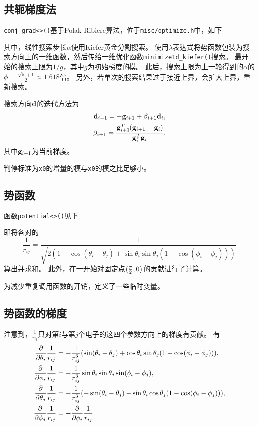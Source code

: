 \subsection{共轭梯度法}
\texttt{conj\_grad<>()}基于Polak-Ribiere算法，位于\texttt{misc/optimize.h}中，如下
{
    \linespread{1.0}
    
}
其中，线性搜索步长$\alpha$使用Kiefer黄金分割搜索。
使用$\lambda$表达式将势函数包装为搜索方向上的一维函数，然后传给一维优化函数\texttt{minimize1d\_kiefer()}搜索。
最开始的搜索上限为$1/g$，其中$g$为初始梯度的模。
此后，搜索上限为上一轮得到的$\alpha$的$\phi = \frac{\sqrt{5}+1}{2} \approx 1.618$倍。
另外，若单次的搜索结果过于接近上界，会扩大上界，重新搜索。

搜索方向$\vb{d}$的迭代方法为
\begin{gather}
    \vb{d}_{i+1} = -\vb{g}_{i+1} + \beta_{i+1}\vb{d}_{i},\\
    \beta_{i+1} = \frac{\vb{g}^T_{i+1}(\vb{g}_{i+1}-\vb{g}_{i})}{\vb{g}^T_{i}\vb{g}_{i}}.
\end{gather}
其中$\vb{g}_{i+1}$为当前梯度。

判停标准为\texttt{x0}的增量的模与\texttt{x0}的模之比足够小。
\subsection{势函数}
函数\texttt{potential<>()}见下
{
    \linespread{1.0}
    
}
即将各对的
\begin{equation}
\frac{1}{r_{ij}} = \frac{1}{\sqrt{2(1-\cos(\theta_i - \theta_j) + \sin{\theta_i}\sin{\theta_j}(1-\cos(\phi_i - \phi_j)))}}
\end{equation}
算出并求和。
此外，在一开始对固定点$\qty(\frac{\pi}{2}, 0)$的贡献进行了计算。

为减少重复调用函数的开销，定义了一些临时变量。
\subsection{势函数的梯度}\label{ssec:grad}
注意到，$\frac{1}{r_{ij}}$只对第$i$与第$j$个电子的这四个参数方向上的梯度有贡献。
有
\begin{align}
    \pdv{\theta_i}\frac{1}{r_{ij}} &{}= -\frac{1}{r^3_{ij}}(\sin(\theta_i - \theta_j) + \cos{\theta_i}\sin{\theta_j}(1-\cos(\phi_i - \phi_j))),\\
    \pdv{\phi_i}\frac{1}{r_{ij}} &{}= -\frac{1}{r^3_{ij}}\sin{\theta_i}\sin{\theta_j}\sin(\phi_i - \phi_j),\\
    \pdv{\theta_j}\frac{1}{r_{ij}} &{}= -\frac{1}{r^3_{ij}}(-\sin(\theta_i - \theta_j) + \sin{\theta_i}\cos{\theta_j}(1-\cos(\phi_i - \phi_j))),\\
    \pdv{\phi_j}\frac{1}{r_{ij}} &{}= -\pdv{\phi_i}\frac{1}{r_{ij}}.
\end{align}


